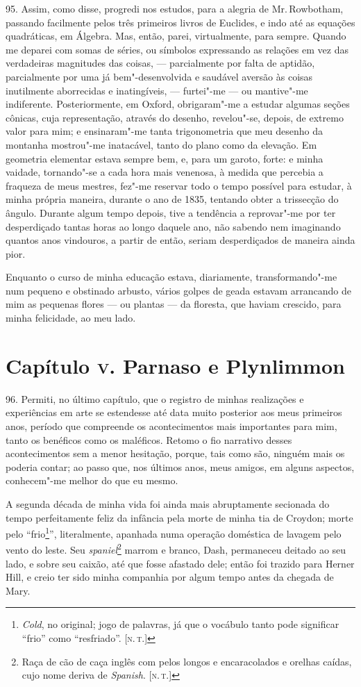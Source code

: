95. Assim, como disse, progredi nos estudos, para a alegria de Mr.\,Rowbotham, passando facilmente pelos três primeiros livros de Euclides,
e indo até as equações quadráticas, em Álgebra. Mas, então, parei,
virtualmente, para sempre. Quando me deparei com somas de séries, ou
símbolos expressando as relações em vez das verdadeiras magnitudes das
coisas, --- parcialmente por falta de aptidão, parcialmente por uma já
bem"-desenvolvida e saudável aversão às coisas inutilmente aborrecidas e
inatingíveis, --- furtei"-me --- ou mantive"-me indiferente. Posteriormente,
em Oxford, obrigaram"-me a estudar algumas seções cônicas, cuja
representação, através do desenho, revelou"-se, depois, de extremo valor
para mim; e ensinaram"-me tanta trigonometria que meu desenho da montanha
mostrou"-me inatacável, tanto do plano como da elevação. Em geometria
elementar estava sempre bem, e, para um garoto, forte: e minha vaidade,
tornando"-se a cada hora mais venenosa, à medida que percebia a fraqueza
de meus mestres, fez"-me reservar todo o tempo possível para estudar, à
minha própria maneira, durante o ano de 1835, tentando obter a
trissecção do ângulo. Durante algum tempo depois, tive a tendência a
reprovar"-me por ter desperdiçado tantas horas ao longo daquele ano, não
sabendo nem imaginando quantos anos vindouros, a partir de então, seriam
desperdiçados de maneira ainda pior.

Enquanto o curso de minha educação estava, diariamente, transformando"-me
num pequeno e obstinado arbusto, vários golpes de geada estavam
arrancando de mim as pequenas flores --- ou plantas --- da floresta, que
haviam crescido, para minha felicidade, ao meu lado.

\chapter{Capítulo \textsc{v}. Parnaso e Plynlimmon}

96. Permiti, no último capítulo, que o registro de minhas realizações e
experiências em arte se estendesse até data muito posterior aos meus
primeiros anos, período que compreende os acontecimentos mais
importantes para mim, tanto os benéficos como os maléficos. Retomo o fio
narrativo desses acontecimentos sem a menor hesitação, porque, tais como
são, ninguém mais os poderia contar; ao passo que, nos últimos anos,
meus amigos, em alguns aspectos, conhecem"-me melhor do que eu mesmo.

A segunda década de minha vida foi ainda mais abruptamente secionada do
tempo perfeitamente feliz da infância pela morte de minha tia de
Croydon; morte pelo ``frio\footnote{\emph{Cold}, no original; jogo de
  palavras, já que o vocábulo tanto pode significar ``frio'' como
  ``resfriado''. {[}\textsc{n.\,t.}{]}}'', literalmente, apanhada numa operação
doméstica de lavagem pelo vento do leste. Seu \emph{spaniel}\footnote{Raça
  de cão de caça inglês com pelos longos e encaracolados e orelhas
  caídas, cujo nome deriva de \emph{Spanish}. {[}\textsc{n.\,t.}{]}} marrom e
branco, Dash, permaneceu deitado ao seu lado, e sobre seu caixão, até
que fosse afastado dele; então foi trazido para Herner Hill, e creio ter
sido minha companhia por algum tempo antes da chegada de Mary.

